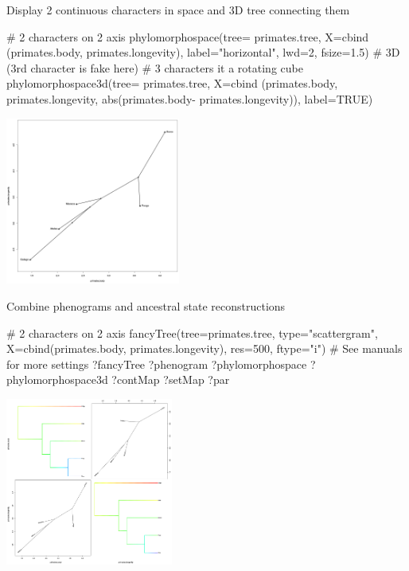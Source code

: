 \documentclass[compress, ucs, xelatex, 11pt, xcolor=svgnames,
  hyperref={
    bookmarks=true,
    unicode=true,
    colorlinks=true,
    pdftitle={Molecular data in R},
    plainpages=false,
    pdfauthor={Vojtech Zeisek},
    pdfsubject={Course about phylogeny and evolution in R},
    pdfcreator={XeLaTeX},
    pdfkeywords={R, evolution, phylogeny, molecular data},
    linkcolor=Tomato,
    anchorcolor=SaddleBrown,
    citecolor=Goldenrod,
    filecolor=DarkMagenta,
    menucolor=Sienna,
    urlcolor=DarkTurquoise,
    pdftex},
  url={hyphens, lowtilde} %
  ]{beamer}
\begin{document}
\begin{frame}[fragile]{Display 2 continuous characters in space and 3D tree connecting them}
\begin{multicols}{2}
  \begin{spluscode}
    # 2 characters on 2 axis
    phylomorphospace(tree=
      primates.tree, X=cbind
      (primates.body,
      primates.longevity),
      label="horizontal",
      lwd=2, fsize=1.5)
    # 3D (3rd character is fake here)
    # 3 characters it a rotating cube
    phylomorphospace3d(tree=
      primates.tree, X=cbind
      (primates.body,
      primates.longevity,
      abs(primates.body-
      primates.longevity)),
      label=TRUE)
  \end{spluscode}
  \begin{center}
    \includegraphics[height=5.5cm]{phylomorphospace.png}
  \end{center}
\end{multicols}
\end{frame}

\begin{frame}[fragile]{Combine phenograms and ancestral state reconstructions}
\begin{multicols}{2}
  \begin{spluscode}
    # 2 characters on 2 axis
    fancyTree(tree=primates.tree,
      type="scattergram",
      X=cbind(primates.body,
      primates.longevity),
      res=500, ftype="i")
    # See manuals for more settings
    ?fancyTree
    ?phenogram
    ?phylomorphospace
    ?phylomorphospace3d
    ?contMap
    ?setMap
    ?par
  \end{spluscode}
  \begin{center}
    \includegraphics[height=5.5cm]{phenogram-ace.png}
  \end{center}
\end{multicols}
\end{frame}
\end{document}
